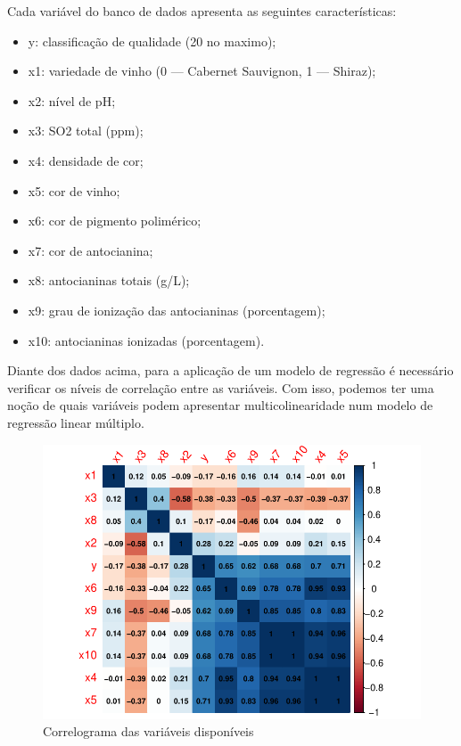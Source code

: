 \documentclass[
  letterpaper,
  DIV=11,
  numbers=noendperiod]{scrartcl}
\begin{document}
Cada variável do banco de dados apresenta as seguintes características:

\begin{itemize}
  \item y: classificação de qualidade (20 no maximo);
  \item x1: variedade de vinho (0 — Cabernet Sauvignon, 1 — Shiraz);
  \item x2: nível de pH;
  \item x3: SO2 total (ppm);
  \item x4: densidade de cor;
  \item x5: cor de vinho;
  \item x6: cor de pigmento polimérico;
  \item x7: cor de antocianina;
  \item x8: antocianinas totais (g/L);
  \item x9: grau de ionização das antocianinas (porcentagem);
  \item x10: antocianinas ionizadas (porcentagem).
\end{itemize}

\newpage{}

Diante dos dados acima, para a aplicação de um modelo de regressão é
necessário verificar os níveis de correlação entre as variáveis. Com
isso, podemos ter uma noção de quais variáveis podem apresentar
multicolinearidade num modelo de regressão linear múltiplo.

\begin{figure}

{\centering \includegraphics{lista2_files/figure-pdf/unnamed-chunk-3-1.pdf}

}

\caption{Correlograma das variáveis disponíveis}

\end{figure}
\end{document}
